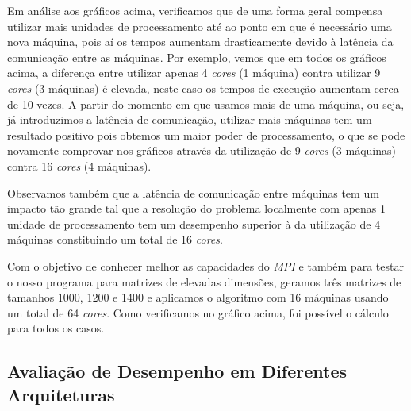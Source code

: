 \documentclass{llncs}
\begin{document}
Em análise aos gráficos acima, verificamos que de uma forma geral compensa utilizar mais unidades de processamento até ao ponto em que é necessário uma nova máquina, pois aí os tempos aumentam drasticamente devido à latência da comunicação entre as máquinas. Por exemplo, vemos que em todos os gráficos acima, a diferença entre utilizar apenas 4 \textit{cores} (1 máquina) contra utilizar 9 \textit{cores} (3 máquinas) é elevada, neste caso os tempos de execução aumentam cerca de 10 vezes. A partir do momento em que usamos mais de uma máquina, ou seja, já introduzimos a latência de comunicação, utilizar mais máquinas tem um resultado positivo pois obtemos um maior poder de processamento, o que se pode novamente comprovar nos gráficos através da utilização de 9 \textit{cores} (3 máquinas) contra 16 \textit{cores} (4 máquinas).

Observamos também que a latência de comunicação entre máquinas tem um impacto tão grande tal que a resolução do problema localmente com apenas 1 unidade de processamento tem um desempenho superior à da utilização de 4 máquinas constituindo um total de 16 \textit{cores}.

\begin{center}
\end{center}

Com o objetivo de conhecer melhor as capacidades do \textit{MPI} e também para testar o nosso programa para matrizes de elevadas dimensões, geramos três matrizes de tamanhos 1000, 1200 e 1400 e aplicamos o algoritmo com 16 máquinas usando um total de 64 \textit{cores}. Como verificamos no gráfico acima, foi possível o cálculo para todos os casos.    

\subsection{Avaliação de Desempenho em Diferentes Arquiteturas}
\end{document}
